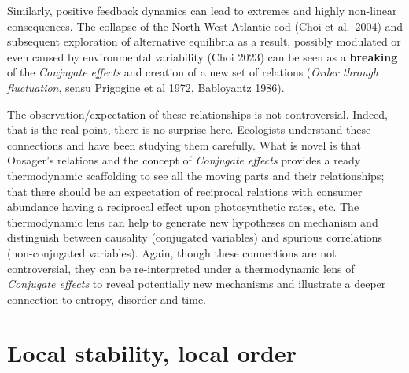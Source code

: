 \documentclass[11pt,letterpaper,]{paper}
\begin{document}
Similarly, positive feedback dynamics can lead to extremes and highly
non-linear consequences. The collapse of the North-West Atlantic cod
(Choi et al.~2004) and subsequent exploration of alternative equilibria
as a result, possibly modulated or even caused by environmental
variability (Choi 2023) can be seen as a \textbf{breaking} of the
\emph{Conjugate effects} and creation of a new set of relations
(\emph{Order through fluctuation}, sensu Prigogine et al 1972,
Babloyantz 1986).

The observation/expectation of these relationships is not controversial.
Indeed, that is the real point, there is no surprise here. Ecologists
understand these connections and have been studying them carefully. What
is novel is that Onsager's relations and the concept of \emph{Conjugate
effects} provides a ready thermodynamic scaffolding to see all the
moving parts and their relationships; that there should be an
expectation of reciprocal relations with consumer abundance having a
reciprocal effect upon photosynthetic rates, etc. The thermodynamic lens
can help to generate new hypotheses on mechanism and distinguish between
causality (conjugated variables) and spurious correlations
(non-conjugated variables). Again, though these connections are not
controversial, they can be re-interpreted under a thermodynamic lens of
\emph{Conjugate effects} to reveal potentially new mechanisms and
illustrate a deeper connection to entropy, disorder and time.

\section{Local stability, local
order}\label{local-stability-local-order}
\end{document}
